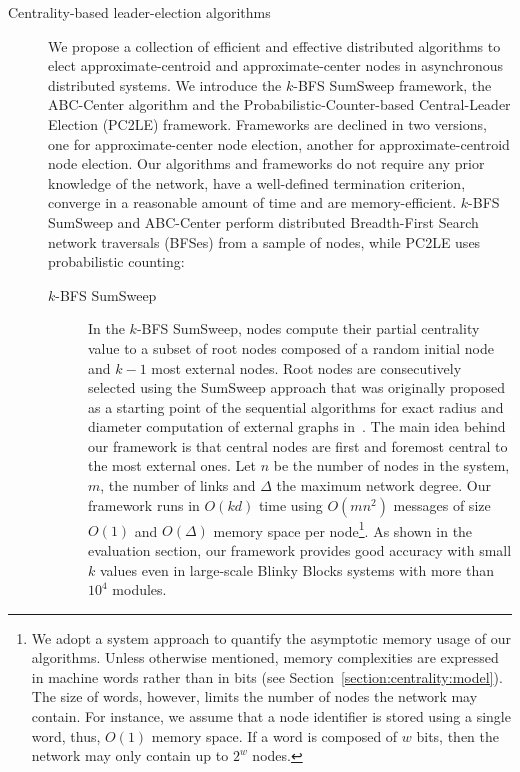 \begin{description}
	\item [Centrality-based leader-election algorithms] We propose a collection of efficient and effective distributed algorithms to elect approximate-centroid and approximate-center nodes in asynchronous distributed systems. We introduce the $k$-BFS SumSweep framework, the ABC-Center algorithm and the Probabilistic-Counter-based Central-Leader Election (PC2LE) framework. Frameworks are declined in two versions, one for approximate-center node election, another for approximate-centroid node election.
	Our algorithms and frameworks do not require any prior knowledge of the network, have a well-defined termination criterion, converge in a reasonable amount of time and are memory-efficient. $k$-BFS SumSweep and ABC-Center perform distributed Breadth-First Search network traversals (BFSes) from a sample of nodes, while PC2LE uses probabilistic counting:
	\begin{description}
		\item[$k$-BFS SumSweep] In the $k$-BFS SumSweep, nodes compute their partial centrality value to a subset of root nodes composed of a random initial node and $k-1$ most external nodes. Root nodes are consecutively selected using the SumSweep approach that was originally proposed as a starting point of the sequential algorithms for exact radius and diameter computation of external graphs in~\cite{borassi2014solvability}. The main idea behind our framework is that central nodes are first and foremost central to the most external ones. Let $n$ be the number of nodes in the system, $m$, the number of links and $\Delta$ the maximum network degree. Our framework runs in $O(kd)$ time using $O(mn^2)$ messages of size $O(1)$ and $O(\Delta)$ memory space per node\footnote{We adopt a system approach to quantify the asymptotic memory usage of our algorithms. Unless otherwise mentioned, memory complexities are expressed in machine words rather than in bits (see Section~\ref{section:centrality:model}). The size of words, however, limits the number of nodes the network may contain. For instance, we assume that a node identifier is stored using a single word, thus, $O(1)$ memory space. If a word is composed of $w$ bits, then the network may only contain up to $2^w$ nodes.}. As shown in the evaluation section, our framework provides good accuracy with small $k$ values even in large-scale Blinky Blocks systems with more than $10^4$ modules.

\end{description}
\end{description}
